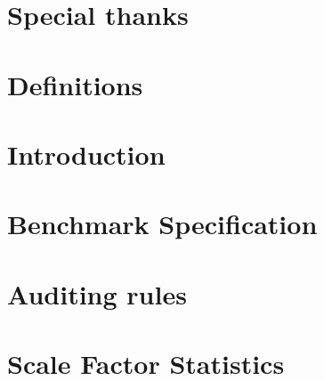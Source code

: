 \documentclass{ldbc}
\begin{document}
\maketitle

%

\chapter*{Special thanks}


\listoffigures
\listoftables
\chapter*{Definitions}


\chapter{Introduction}


\chapter{Benchmark Specification}


%
%
%

\chapter{Auditing rules}\label{chapter:auditing}





\appendix

\chapter{Scale Factor Statistics}

\end{document}
